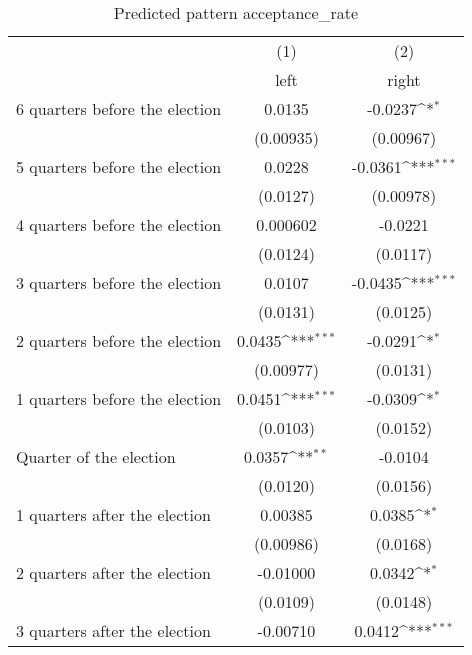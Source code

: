 \begin{table}[htbp]\centering
\def\sym#1{\ifmmode^{#1}\else\(^{#1}\)\fi}
\caption{Predicted pattern acceptance\_rate}
\begin{tabular}{l*{2}{c}}
\hline\hline
                    &\multicolumn{1}{c}{(1)}&\multicolumn{1}{c}{(2)}\\
                    &\multicolumn{1}{c}{left}&\multicolumn{1}{c}{right}\\
\hline
 6 quarters before the election&      0.0135         &     -0.0237\sym{*}  \\
                    &   (0.00935)         &   (0.00967)         \\
[1em]
 5 quarters before the election&      0.0228         &     -0.0361\sym{***}\\
                    &    (0.0127)         &   (0.00978)         \\
[1em]
 4 quarters before the election&    0.000602         &     -0.0221         \\
                    &    (0.0124)         &    (0.0117)         \\
[1em]
 3 quarters before the election&      0.0107         &     -0.0435\sym{***}\\
                    &    (0.0131)         &    (0.0125)         \\
[1em]
 2 quarters before the election&      0.0435\sym{***}&     -0.0291\sym{*}  \\
                    &   (0.00977)         &    (0.0131)         \\
[1em]
 1 quarters before the election&      0.0451\sym{***}&     -0.0309\sym{*}  \\
                    &    (0.0103)         &    (0.0152)         \\
[1em]
Quarter of the election&      0.0357\sym{**} &     -0.0104         \\
                    &    (0.0120)         &    (0.0156)         \\
[1em]
 1 quarters after the election&     0.00385         &      0.0385\sym{*}  \\
                    &   (0.00986)         &    (0.0168)         \\
[1em]
 2 quarters after the election&    -0.01000         &      0.0342\sym{*}  \\
                    &    (0.0109)         &    (0.0148)         \\
[1em]
 3 quarters after the election&    -0.00710         &      0.0412\sym{***}\\

\end{tabular}
\end{table}
